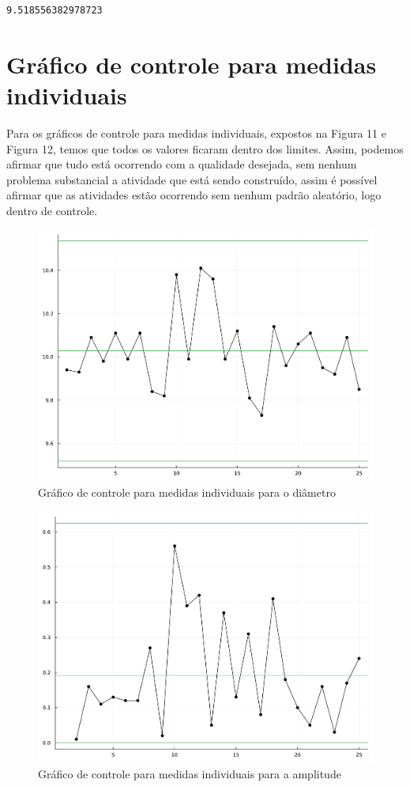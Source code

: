 \documentclass[
  letterpaper,
  DIV=11,
  numbers=noendperiod]{scrartcl}
\begin{document}
\begin{verbatim}
9.518556382978723
\end{verbatim}

\pagebreak

\section{Gráfico de controle para medidas individuais}

Para os gráficos de controle para medidas individuais, expostos na
Figura 11 e Figura 12, temos que todos os valores ficaram dentro dos
limites. Assim, podemos afirmar que tudo está ocorrendo com a qualidade
desejada, sem nenhum problema substancial a atividade que está sendo
construído, assim é possível afirmar que as atividades estão ocorrendo
sem nenhum padrão aleatório, logo dentro de controle.

\begin{figure}

{\centering \includegraphics{trabalho1_files/figure-pdf/fig11-output-1.pdf}

}

\caption{Gráfico de controle para medidas individuais para o diâmetro}

\end{figure}

\begin{figure}

{\centering \includegraphics{trabalho1_files/figure-pdf/fig12-output-1.pdf}

}

\caption{Gráfico de controle para medidas individuais para a amplitude}

\end{figure}
\end{document}
